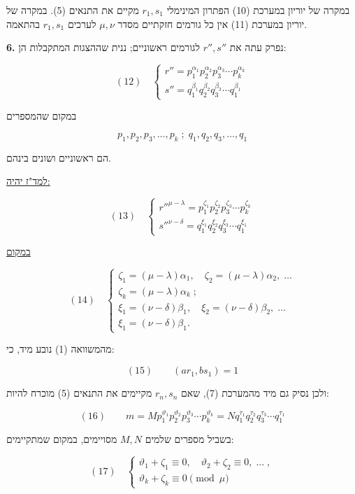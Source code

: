 במקרה של יוריון %
במערכת (10) הפתרון המינימלי $r_1, s_1$ מקיים את התנאים (5). במקרה
של יוריון במערכת (11) אין כל גורמים חזקתיים מסדר $\mu, \nu$ לערכים
$r_1, s_1$ בהתאמה.

\noindent\textbf{6.} נפרק עתה את $r'', s''$ לגורמים ראשוניים; ננית שההצגות המתקבלות הן:

\[ (12) \quad
\begin{cases}
r'' = p_1^{\alpha_1} p_2^{\alpha_2} p_3^{\alpha_3} \cdots p_k^{\alpha_k} \\
s'' = q_1^{\beta_1} q_2^{\beta_2} q_3^{\beta_3} \cdots q_1^{\beta_1}
\end{cases}
\]

במקום שהמספרים

\[ p_1, p_2, p_3, \ldots, p_k \; ; \; q_1, q_2, q_3, \ldots, q_1 \]

\noindent הם ראשוניים ושונים בינהם.

\underline{למד"ז יהיה:}

\[ (13) \quad
\begin{cases}
r''^{\mu-\lambda} = p_1^{\zeta_1} p_2^{\zeta_2} p_3^{\zeta_3} \cdots p_k^{\zeta_k} \\
s''^{\nu-\delta} = q_1^{\xi_1} q_2^{\xi_2} q_3^{\xi_3} \cdots q_1^{\xi_1}
\end{cases}
\]

\underline{במקום}

\[ (14) \quad
\begin{cases}
\zeta_1 = (\mu-\lambda)\alpha_1 , \quad \zeta_2 = (\mu-\lambda)\alpha_2 , \; \ldots \\
\zeta_k = (\mu-\lambda)\alpha_k \; ; \\[4pt]
\xi_1 = (\nu-\delta)\beta_1 , \quad \xi_2 = (\nu-\delta)\beta_2 , \; \ldots \\
\xi_1 = (\nu-\delta)\beta_1 .
\end{cases}
\]

מהמשוואה (1) נובע מיד, כי:

\[ (15) \qquad (ar_1 , bs_1) = 1 \]

ולכן נסיק גם מיד מהמערכת (7), שאם $r_n, s_n$ מקיימים את התנאים (5)
מוכרח להיות:

\[ (16) \qquad m = M p_1^{\vartheta_1} p_2^{\vartheta_2} p_3^{\vartheta_3} \cdots p_k^{\vartheta_k}
= N q_1^{\tau_1} q_2^{\tau_2} q_3^{\tau_3} \cdots q_1^{\tau_1} \]

בשביל מספרים שלמים $M, N$ מסויימים, במקום שמתקיימים:

\[ (17) \quad
\begin{cases}
\vartheta_1 + \zeta_1 \equiv 0 , \quad \vartheta_2 + \zeta_2 \equiv 0 , \; \ldots \; , \\
\vartheta_k + \zeta_k \equiv 0 \pmod{\mu}
\end{cases}
\]

